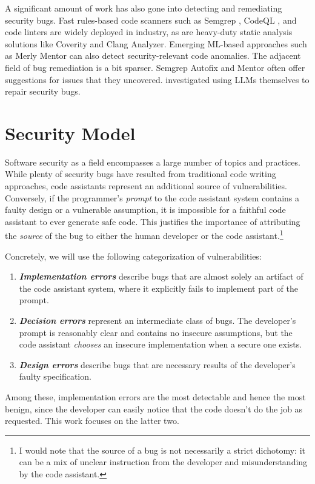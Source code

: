 \documentclass[sigplan,screen,nonacm]{acmart}
\begin{document}
A significant amount of work has also gone into detecting and remediating security bugs. Fast rules-based code scanners such as Sem\-grep \cite{semgrep}, CodeQL \cite{codeql, gh-codescanning}, and code linters are widely deployed in industry, as are heavy-duty static analysis solutions like Coverity \cite{coverity} and Clang Analyzer. Emerging ML-based approaches such as Merly Mentor \cite{merly-mentor} can also detect security-relevant code anomalies. The adjacent field of bug remediation is a bit sparser. Sem\-grep Autofix and Mentor often offer suggestions for issues that they uncovered.  \cite{llm-repairs} investigated using LLMs themselves to repair security bugs.

\section{Security Model} \label{sec:model}

Software security as a field encompasses a large number of topics and practices. While plenty of security bugs have resulted from traditional code writing approaches, code assistants represent an additional source of vulnerabilities. Conversely, if the programmer's \emph{prompt} to the code assistant system contains a faulty design or a vulnerable assumption, it is impossible for a faithful code assistant to ever generate safe code. This justifies the importance of attributing the \emph{source} of the bug to either the human developer or the code assistant.\footnote{I would note that the source of a bug is not necessarily a strict dichotomy: it can be a mix of unclear instruction from the developer and misunderstanding by the code assistant.}

Concretely, we will use the following categorization of vulnerabilities:
\begin{enumerate}
    \item \emph{\textbf{Implementation errors}} describe bugs that are almost solely an artifact of the code assistant system, where it explicitly fails to implement part of the prompt.
    \item \emph{\textbf{Decision errors}} represent an intermediate class of bugs. The developer's prompt is reasonably clear and contains no insecure assumptions, but the code assistant \emph{chooses} an insecure implementation when a secure one exists.
    \item \emph{\textbf{Design errors}} describe bugs that are necessary results of the developer's faulty specification.
\end{enumerate}
Among these, implementation errors are the most detectable and hence the most benign, since the developer can easily notice that the code doesn't do the job as requested. This work focuses on the latter two.
\end{document}
